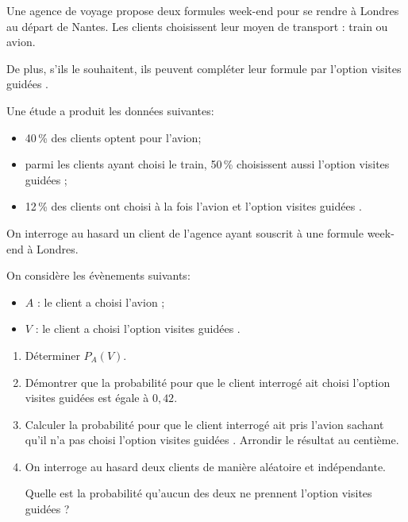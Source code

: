 \medskip

Une agence de voyage propose deux formules week-end pour se rendre à Londres au départ de Nantes. Les clients choisissent leur moyen de transport : train ou avion.

De plus, s'ils le souhaitent, ils peuvent compléter leur formule par l'option \og visites guidées \fg.

Une étude a produit les données suivantes:

\setlength\parindent{9mm}
\begin{itemize}
\item[$\bullet~~$] 40\,\% des clients optent pour l'avion;
\item[$\bullet~~$]parmi les clients ayant choisi le train, 50\,\% choisissent aussi l'option \og visites guidées \fg{} ;
\item[$\bullet~~$]12\,\% des clients ont choisi à la fois l'avion et l'option \og visites guidées \fg.
\end{itemize}
\setlength\parindent{0mm}

\smallskip

On interroge au hasard un client de l'agence ayant souscrit à une formule week-end à Londres.

On considère les évènements suivants:

\setlength\parindent{9mm}
\begin{itemize}
\item $A$ : \og le client a choisi l'avion\fg{} ;
\item $V$ : \og le client a choisi l'option \og visites guidées \fg{}\fg.
\end{itemize}
\setlength\parindent{0mm}

\medskip

\begin{enumerate}
\item Déterminer $P_A(V)$.
\item Démontrer que la probabilité pour que le client interrogé ait choisi l'option
\og visites guidées\fg{} est égale à $0,42$.
\item Calculer la probabilité pour que le client interrogé ait pris l'avion sachant qu'il
n'a pas choisi l'option \og visites guidées \fg. Arrondir le résultat au centième.
\item On interroge au hasard deux clients de manière aléatoire et indépendante.

Quelle est la probabilité qu'aucun des deux ne prennent l'option \og visites guidées\fg{} ?
\end{enumerate}
